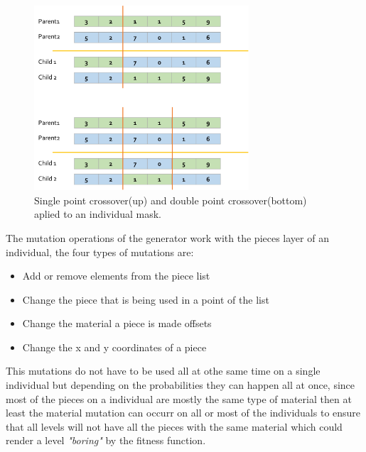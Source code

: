 \documentclass[conference]{IEEEtran}
\begin{document}
    \begin{figure}[htbp]
        \centerline{\includegraphics[width=80mm]{Images/crossover.png}}
        \caption{Single point crossover(up) and double point crossover(bottom) aplied to an individual mask.}
        \label{crossover}
    \end{figure}
    
    The mutation operations of the generator work with the pieces layer of an
    individual, the four types of mutations are:
    
    \begin{itemize}
        \item Add or remove elements from the piece list
        \item Change the piece that is being used in a point of the list
        \item Change the material a piece is made offsets
        \item Change the x and y coordinates of a piece
    \end{itemize}
    
    This mutations do not have to be used all at othe same time on a single
    individual but depending on the probabilities they can happen all at once,
    since most of the pieces on a individual are mostly the same type of
    material then at least the material mutation can occurr on all or most of
    the individuals to ensure that all levels will not have all the pieces with
    the same material which could render a level \textit{"boring"} by the
    fitness function.
    
\end{document}
